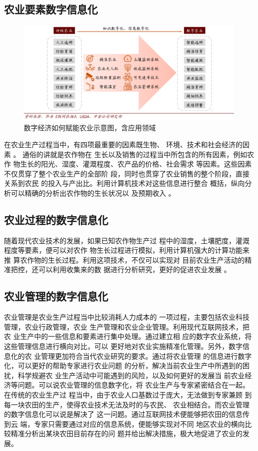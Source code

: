 \documentclass[a4paper]{article}
\begin{document}
\subsection{农业要素数字信息化}
\begin{figure}[ht]
	\centering
	\includegraphics[scale=0.5]{longye.png}
	\caption{数字经济如何赋能农业示意图，含应用领域}
\end{figure}
\par
在农业生产过程当中，有四项最重要的因素既生物、
环境、技术和社会经济的因素
\cite{中金}。
通俗的讲就是农作物在
生长以及销售的过程当中所包含的所有因素，例如农作
物生长的阳光、湿度、灌溉程度、农产品的价格、社会需求
等因素。这些因素不仅贯穿了整个农业生产的全部阶
段，同时也贯穿了农业销售的整个阶段，直接关系到农民
的投入与产出比。利用计算机技术对这些信息进行整合
概括，纵向分析可以精确的分析出农作物的生长状况以
及预期收入
\cite{zoutao}。

\subsection{农业过程的数字信息化}
随着现代农业技术的发展，如果已知农作物生产过
程中的湿度，土壤肥度，灌溉程度等要素，便可以对农作
物生长过程进行模拟，利用计算机强大的计算功能来推
算农作物的生长过程。利用这项技术，不仅可以实现对
目前农业生产活动的精准把控，还可以利用收集来的数
据进行分析研究，更好的促进农业发展
\cite{刘雨轩2019发展}。

\subsection{农业管理的数字信息化}
农业管理是农业生产过程当中比较消耗人力成本的
一项过程，主要包括农业科技管理，农业行政管理，农业
生产管理和农业企业管理。利用现代互联网技术，把农
业生产中的一些信息和要素进行集中处理。通过建立相
应的数字农业系统，将这些管理信息进行横向对比，可以
更好地对农业实施精准化管理。另外，数字信息化的农
业管理更加符合当代农业研究的要求。通过将农业管理
的信息进行数字化，可以更好的帮助专家进行农业问题
的分析，解决当前农业生产中所遇到的困扰，科学规避农
业生产活动中可能遇到的风险，以及如何更好的发展当
前农业经济等问题。可以说农业管理的信息数字化，将
农业生产与专家紧密结合在一起。在传统的农业生产过
程当中，由于农业人口基数过于庞大，无法做到专家兼顾
到每一块农田的生产，使得农业技术无法及时的与农民、
农业相结合。而农业管理的数字信息化可以说是解决了
这一问题。通过互联网技术便能够把农田的信息传到云
端，专家只需要通过对应的信息系统，便能够实现对不同
地区农业的横向比较精准分析出某块农田目前存在的问
题并给出解决措施，极大地促进了农业的发展。
\end{document}

